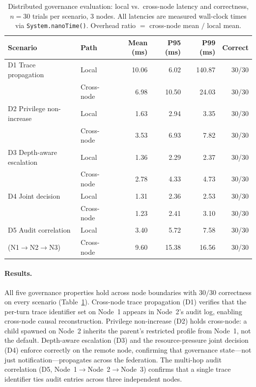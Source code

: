 \begin{table}[t]
\centering
\caption{Distributed governance evaluation: local vs.\ cross-node
latency and correctness, $n=30$ trials per scenario, 3 nodes. All
latencies are measured wall-clock times via \texttt{System.nanoTime()}.
Overhead ratio $=$ cross-node mean $/$ local mean.}
\label{tab:distributed}
\begin{tabular}{llrrrr}
\toprule
Scenario & Path & Mean (ms) & P95 (ms) & P99 (ms) & Correct \\
\midrule
D1 Trace propagation      & Local       & 10.06 & 6.02   & 140.87 & 30/30 \\
                          & Cross-node  & 6.98  & 10.50  & 24.03  & 30/30 \\
\addlinespace
D2 Privilege non-increase & Local       & 1.63  & 2.94   & 3.35   & 30/30 \\
                          & Cross-node  & 3.53  & 6.93   & 7.82   & 30/30 \\
\addlinespace
D3 Depth-aware escalation & Local       & 1.36  & 2.29   & 2.37   & 30/30 \\
                          & Cross-node  & 2.78  & 4.33   & 4.73   & 30/30 \\
\addlinespace
D4 Joint decision         & Local       & 1.31  & 2.36   & 2.53   & 30/30 \\
                          & Cross-node  & 1.23  & 2.41   & 3.10   & 30/30 \\
\addlinespace
D5 Audit correlation      & Local       & 3.40  & 5.72   & 7.58   & 30/30 \\
(N1$\to$N2$\to$N3)       & Cross-node  & 9.60  & 15.38  & 16.56  & 30/30 \\
\bottomrule
\end{tabular}
\end{table}

\paragraph{Results.}
All five governance properties hold across node boundaries with
$30/30$ correctness on every scenario (Table~\ref{tab:distributed}).
Cross-node trace propagation (D1) verifies that the per-turn trace
identifier set on Node~1 appears in Node~2's audit log, enabling
cross-node causal reconstruction. Privilege non-increase (D2) holds
cross-node: a child spawned on Node~2 inherits the parent's restricted
profile from Node~1, not the default. Depth-aware escalation (D3) and
the resource-pressure joint decision (D4) enforce correctly on the
remote node, confirming that governance state---not just
notification---propagates across the federation. The multi-hop audit
correlation (D5, Node~1$\to$Node~2$\to$Node~3) confirms that a single
trace identifier ties audit entries across three independent nodes.

